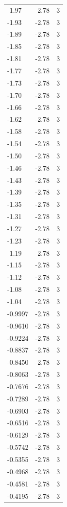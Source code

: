 \begin{longtable}{lrr}
  -1.97 & -2.78 & 3 \\
  -1.93 & -2.78 & 3 \\
  -1.89 & -2.78 & 3 \\
  -1.85 & -2.78 & 3 \\
  -1.81 & -2.78 & 3 \\
  -1.77 & -2.78 & 3 \\
  -1.73 & -2.78 & 3 \\
  -1.70 & -2.78 & 3 \\
  -1.66 & -2.78 & 3 \\
  -1.62 & -2.78 & 3 \\
  -1.58 & -2.78 & 3 \\
  -1.54 & -2.78 & 3 \\
  -1.50 & -2.78 & 3 \\
  -1.46 & -2.78 & 3 \\
  -1.43 & -2.78 & 3 \\
  -1.39 & -2.78 & 3 \\
  -1.35 & -2.78 & 3 \\
  -1.31 & -2.78 & 3 \\
  -1.27 & -2.78 & 3 \\
  -1.23 & -2.78 & 3 \\
  -1.19 & -2.78 & 3 \\
  -1.15 & -2.78 & 3 \\
  -1.12 & -2.78 & 3 \\
  -1.08 & -2.78 & 3 \\
  -1.04 & -2.78 & 3 \\
  -0.9997 & -2.78 & 3 \\
  -0.9610 & -2.78 & 3 \\
  -0.9224 & -2.78 & 3 \\
  -0.8837 & -2.78 & 3 \\
  -0.8450 & -2.78 & 3 \\
  -0.8063 & -2.78 & 3 \\
  -0.7676 & -2.78 & 3 \\
  -0.7289 & -2.78 & 3 \\
  -0.6903 & -2.78 & 3 \\
  -0.6516 & -2.78 & 3 \\
  -0.6129 & -2.78 & 3 \\
  -0.5742 & -2.78 & 3 \\
  -0.5355 & -2.78 & 3 \\
  -0.4968 & -2.78 & 3 \\
  -0.4581 & -2.78 & 3 \\
  -0.4195 & -2.78 & 3 \\

\end{longtable}
